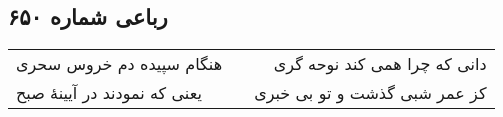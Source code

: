 \begin{center}
\section*{رباعی شماره ۶۵۰}
\label{sec:sh650}
\begin{longtable}{l p{0.5cm} r}
هنگام سپیده دم خروس سحری
&&
دانی که چرا همی کند نوحه گری
\\
یعنی که نمودند در آیینهٔ صبح
&&
کز عمر شبی گذشت و تو بی خبری
\\
\end{longtable}
\end{center}

